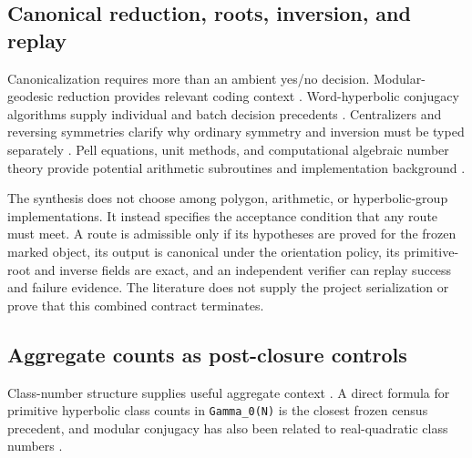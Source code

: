 \documentclass[11pt]{article}
\begin{document}
\hypertarget{23-canonical-reduction-roots-inversion-and-replay}{%
\subsection{Canonical reduction, roots, inversion, and
replay}\label{23-canonical-reduction-roots-inversion-and-replay}}

Canonicalization requires more than an ambient yes/no decision.
Modular-geodesic reduction provides relevant coding context
\citep{P31-S15}.
Word-hyperbolic conjugacy algorithms supply individual and batch decision
precedents
\citep{P31-S16,P31-S17}.
Centralizers and reversing symmetries clarify why ordinary symmetry and
inversion must be typed separately
\citep{P31-S18}.
Pell equations, unit methods, and computational algebraic number theory
provide potential arithmetic subroutines and implementation background
\citep{P31-S19,P31-S20}.

The synthesis does not choose among polygon, arithmetic, or
hyperbolic-group implementations. It instead specifies the acceptance
condition that any route must meet. A route is admissible only if its
hypotheses are proved for the frozen marked object, its output is
canonical under the orientation policy, its primitive-root and inverse
fields are exact, and an independent verifier can replay success and
failure evidence. The literature does not supply the project
serialization or prove that this combined contract terminates.

\hypertarget{24-aggregate-counts-as-post-closure-controls}{%
\subsection{Aggregate counts as post-closure
controls}\label{24-aggregate-counts-as-post-closure-controls}}

Class-number structure supplies useful aggregate context
\citep{P31-S14}.
A direct formula for primitive hyperbolic class counts in
\texttt{Gamma\_0(N)} is the closest frozen census precedent, and modular
conjugacy has also been related to real-quadratic class numbers
\citep{P31-S21,P31-S22}.
\end{document}
